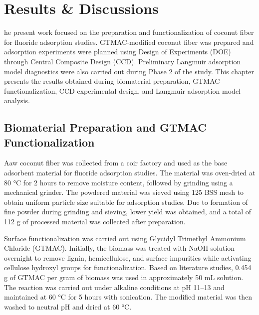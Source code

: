 \chapter{Results \& Discussions}
he present work focused on the preparation and functionalization of coconut fiber for fluoride adsorption studies. GTMAC-modified coconut fiber was prepared and adsorption experiments were planned using Design of Experiments (DOE) through Central Composite Design (CCD). Preliminary Langmuir adsorption model diagnostics were also carried out during Phase 2 of the study. This chapter presents the results obtained during biomaterial preparation, GTMAC functionalization, CCD experimental design, and Langmuir adsorption model analysis.  
\section{Biomaterial Preparation and GTMAC Functionalization}
Aaw coconut fiber was collected from a coir factory and used as the base adsorbent material for fluoride adsorption studies. The material was oven-dried at 80 °C for 2 hours to remove moisture content, followed by grinding using a mechanical grinder. The powdered material was sieved using 125 BSS mesh to obtain uniform particle size suitable for adsorption studies. Due to formation of fine powder during grinding and sieving, lower yield was obtained, and a total of 112 g of processed material was collected after preparation. 

Surface functionalization was carried out using Glycidyl Trimethyl Ammonium Chloride (GTMAC). Initially, the biomass was treated with NaOH solution overnight to remove lignin, hemicellulose, and surface impurities while activating cellulose hydroxyl groups for functionalization. Based on literature studies, 0.454 g of GTMAC per gram of biomass was used in approximately 50 mL solution. The reaction was carried out under alkaline conditions at pH 11–13 and maintained at 60 °C for 5 hours with sonication. The modified material was then washed to neutral pH and dried at 60 °C. 

